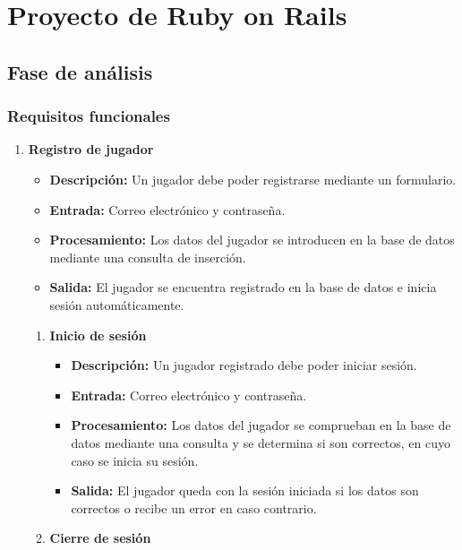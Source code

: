 \chapter{Proyecto de Ruby on Rails}

\section{Fase de análisis}

\subsection{Requisitos funcionales}

\begin{enumerate}[label=\textbf{RF-\arabic*}]
	\item
		\textbf{Registro de jugador}
		\begin{itemize}
			\item
				\textbf{Descripción:}
				Un jugador debe poder registrarse mediante un formulario.
			\item
				\textbf{Entrada:}
				Correo electrónico y contraseña.
			\item
				\textbf{Procesamiento:}
				Los datos del jugador se introducen en la base de datos mediante una consulta de inserción.
			\item
				\textbf{Salida:}
				El jugador se encuentra registrado en la base de datos e inicia sesión automáticamente.
		\end{itemize}
		\begin{enumerate}[label=\textbf{RF-1.\arabic*}]
			\item
				\textbf{Inicio de sesión}
				\begin{itemize}
					\item
						\textbf{Descripción:}
						Un jugador registrado debe poder iniciar sesión.
					\item
						\textbf{Entrada:}
						Correo electrónico y contraseña.
					\item
						\textbf{Procesamiento:}
						Los datos del jugador se comprueban en la base de datos mediante una consulta y se determina si son correctos, en cuyo caso se inicia su sesión.
					\item
						\textbf{Salida:}
						El jugador queda con la sesión iniciada si los datos son correctos o recibe un error en caso contrario.
				\end{itemize}
			\item
				\textbf{Cierre de sesión}
				\begin{itemize}

\end{itemize}
\end{enumerate}
\end{enumerate}
